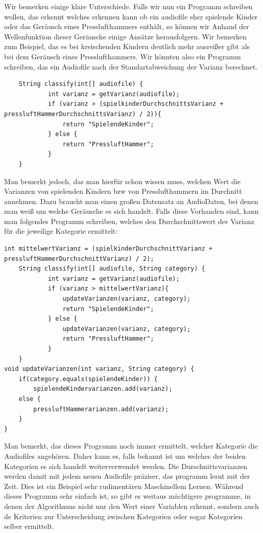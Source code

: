 \documentclass{thesisclass}
\begin{document}
Wir bemerken einige klare Unterschiede. Falls wir nun ein Programm schreiben wollen, das erkennt welches erkennen kann ob ein audiofile eher spielende Kinder oder das Geräusch eines Presslufthammers enthält, so können wir Anhand der Wellenfunktion dieser Geräusche einige Ansätze herausfolgern. Wir bemerken zum Beispiel, das es bei kreischenden Kindern deutlich mehr ausreißer gibt als bei dem Geräusch eines Presslufthammers. Wir könnten also ein Programm schreiben, das ein Audiofile nach der Standartabweichung der Varianz berechnet.
\newpage
\begin{lstlisting}
    String classify(int[] audiofile) {
        	int varianz = getVarianz(audiofile);
			if (varianz > (spielkinderDurchschnittsVarianz + pressluftHammerDurchschnittsVarianz) / 2)){
				return "SpielendeKinder";
			} else {
				return "PressluftHammer";
			}
    }   
\end{lstlisting}

Man bemerkt jedoch, das man hierfür schon wissen muss, welchen Wert die Varianzen von spielenden Kindern bzw von Presslufthammern im Durchnitt annehmen. Dazu braucht man einen großen Datensatz an AudioDaten, bei denen man weiß um welche Geräusche es sich handelt. Falls diese Vorhanden sind, kann man folgendes Programm schreiben, welches den Durchschnittswert der Varianz für die jeweilige Kategorie ermittelt:

\begin{lstlisting}
int mittelwertVarianz = (spielkinderDurchschnittVarianz + pressluftHammerDurchschnittVarianz) / 2);
    String classify(int[] audiofile, String category) {
        	int varianz = getVarianz(audiofile);
			if (varianz > mittelwertVarianz){
				updateVarianzen(varianz, category);				
				return "SpielendeKinder";
			} else {
				updateVarianzen(varianz, category);
				return "PressluftHammer";
			}
    }   
void updateVarianzen(int varianz, String category) {
	if(category.equals(spielendeKinder)) {
		spielendeKindervarianzen.add(varianz);
	else {
		pressluftHammerarianzen.add(varianz);
	}
}
\end{lstlisting}

Man bemerkt, das dieses Programm noch immer ermittelt, welcher Kategorie die Audiofiles angehören. Daher kann es, falls bekannt ist um welches der beiden Kategorien es sich handelt weiterverwendet werden. Die Durschnittsvarianzen werden damit mit jedem neuen Audiofile präziser, das programm lernt mit der Zeit. Dies ist ein Beispiel sehr rudimentären Maschinellem Lernen.\newline
Während dieses Programm sehr einfach ist, so gibt es weitaus mächtigere programme, in denen der Algorithmus nicht nur den Wert einer Variablen erkennt, sondern auch de Kriterien zur Unterscheidung zwischen Kategorien oder sogar Kategorien selber ermittelt.
\end{document}
